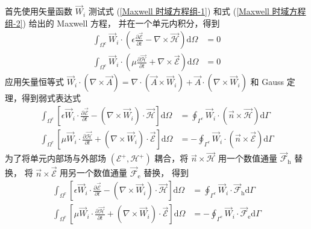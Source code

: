 \begin{solution}
    首先使用矢量函数 $\vec{W}_i$ 测试式 (\ref{Maxwell 时域方程组-1}) 
    和式 (\ref{Maxwell 时域方程组-2}) 给出的 Maxwell 方程，
    并在一个单元内积分，得到
    \begin{align*}
        \int_{\Omega^e}\vec{W}_i\cdot\left(
            \epsilon\frac{\partial\vec{\mathscr{E}}}{\partial t}
            -\nabla\times\vec{\mathscr{H}}
        \right)\text{d}\Omega&=0\\
        \int_{\Omega^e}\vec{W}_i\cdot\left(
            \mu\frac{\partial\vec{\mathscr{H}}}{\partial t}
            +\nabla\times\vec{\mathscr{E}}
        \right)\text{d}\Omega&=0
    \end{align*}
    应用矢量恒等式
    $\vec{W}_i\cdot(\nabla\times \vec{A})
    =\nabla\cdot(\vec{A}\times\vec{W}_i)+\vec{A}\cdot(\nabla\times\vec{W}_i)$
    和 Gauss 定理，得到弱式表达式
    \begin{align*}
        \int_{\Omega^e}\left[
            \epsilon\vec{W}_i\cdot\frac{\partial\vec{\mathscr{E}}}{\partial t}
            -(\nabla\times\vec{W}_i)\cdot\vec{\mathscr{H}}
        \right]\text{d}\Omega
        &=\oint_{\Gamma^e}\vec{W}_i\cdot(\vec{n}\times\vec{\mathscr{H}})\text{d}\Gamma\\
        \int_{\Omega^e}\left[
            \mu\vec{W}_i\cdot\frac{\partial\vec{\mathscr{H}}}{\partial t}
            +(\nabla\times\vec{W}_i)\cdot\vec{\mathscr{E}}
        \right]\text{d}\Omega
        &=-\oint_{\Gamma^e}\vec{W}_i\cdot(\vec{n}\times\vec{\mathscr{E}})\text{d}\Gamma
    \end{align*}
    为了将单元内部场与外部场 $(\mathscr{E}^+, \mathscr{H}^+)$ 耦合，将
    $\vec{n}\times\vec{\mathscr{H}}$ 用一个数值通量 $\vec{\mathscr{F}}_{\text{h}}$ 替换，
    将 $\vec{n}\times\vec{\mathscr{E}}$ 用另一个数值通量 $\vec{\mathscr{F}}_{\text{e}}$ 替换，
    得到
    \begin{align*}
        \int_{\Omega^e}\left[
            \epsilon\vec{W}_i\cdot\frac{\partial\vec{\mathscr{E}}}{\partial t}
            -(\nabla\times\vec{W}_i)\cdot\vec{\mathscr{H}}
        \right]\text{d}\Omega
        &=\oint_{\Gamma^e}\vec{W}_i\cdot\vec{\mathscr{F}}_{\text{h}}\text{d}\Gamma\\
        \int_{\Omega^e}\left[
            \mu\vec{W}_i\cdot\frac{\partial\vec{\mathscr{H}}}{\partial t}
            +(\nabla\times\vec{W}_i)\cdot\vec{\mathscr{E}}
        \right]\text{d}\Omega
        &=-\oint_{\Gamma^e}\vec{W}_i\cdot\vec{\mathscr{F}}_{\text{e}}\text{d}\Gamma
    \end{align*}

\end{solution}
